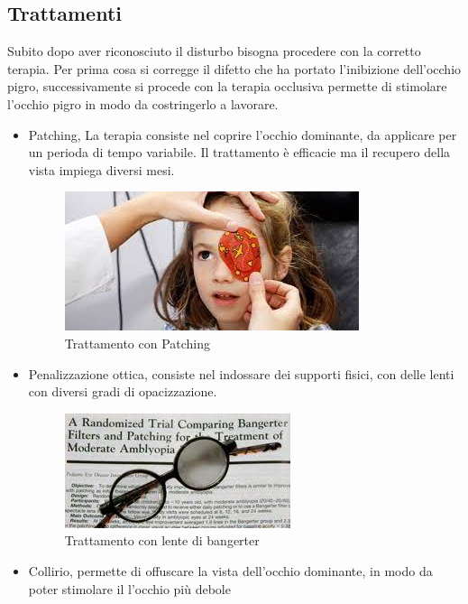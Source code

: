 \documentclass[10pt,a4paper]{article}
\begin{document}
	\subsection{Trattamenti}
	Subito dopo aver riconosciuto il disturbo bisogna procedere con la corretto terapia. Per prima cosa si corregge il difetto che ha portato l'inibizione dell'occhio pigro, successivamente si procede con la terapia occlusiva permette di stimolare l'occhio pigro in modo da costringerlo a lavorare.
	\begin{itemize}
		\item Patching, La terapia consiste nel coprire l'occhio dominante, da applicare per un perioda di tempo variabile.
		Il trattamento è efficacie ma il recupero della vista impiega diversi mesi.       	   
			\begin{figure}[h]
				\centering
				\includegraphics[width=0.7\linewidth]{image/patching}
				\caption{Trattamento con Patching}
				\label{fig:patching}
			\end{figure}	
	
		\item Penalizzazione ottica, consiste nel indossare dei supporti fisici, con delle lenti con diversi gradi di opacizzazione.
		
			\begin{figure}[h]
				\centering
				\includegraphics[width=0.7\linewidth]{image/penalizzazione ottica}
				\caption{Trattamento con lente di bangerter}
				\label{fig:penalizzazione-ottica}
			\end{figure}
    	\newpage
		\item Collirio, permette di offuscare la vista dell'occhio dominante, in modo da poter stimolare il l'occhio più debole
		

\end{itemize}
\end{document}
